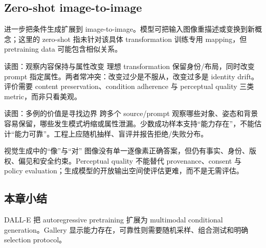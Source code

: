 \subsection{Zero-shot image-to-image}

进一步把条件生成扩展到 image-to-image。模型可把输入图像重描述或变换到新概念；这里的 zero-shot 指未针对该具体 transformation 训练专用 mapping，但 pretraining data 可能包含相似关系。


\begin{knowledgebox}{读图：观察内容保持与属性改变}
理想 transformation 保留身份/布局，同时改变 prompt 指定属性。两者常冲突：改变过少是不服从，改变过多是 identity drift。评价需要 content preservation、condition adherence 与 perceptual quality 三类 metric，而非只看美观。
\end{knowledgebox}


\begin{knowledgebox}{读图：多例的价值是寻找边界}
跨多个 source/prompt 观察哪些对象、姿态和背景容易保留，哪些发生模式坍缩或属性泄漏。少数成功样本支持“能力存在”，不能估计“能力可靠”。工程上应随机抽样、盲评并报告拒绝/失败分布。
\end{knowledgebox}

\begin{warningbox}{视觉生成中的“像”与“对”}
图像没有单一逐像素正确答案，但仍有事实、身份、版权、偏见和安全约束。Perceptual quality 不能替代 provenance、consent 与 policy evaluation；生成模型的开放输出空间使评估更难，而不是无需评估。
\end{warningbox}

\subsection{本章小结}

DALL-E 把 autoregressive pretraining 扩展为 multimodal conditional generation。Gallery 显示能力存在，可靠性则需要随机采样、组合测试和明确 selection protocol。

